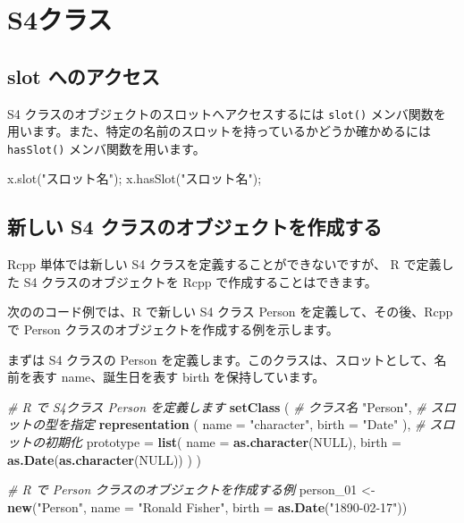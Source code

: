 \documentclass[]{book}
\newenvironment{Shaded}{\begin{snugshade}}{\end{snugshade}}
\newcommand{\CommentTok}[1]{\textcolor[rgb]{0.56,0.35,0.01}{\textit{#1}}}
\newcommand{\DataTypeTok}[1]{\textcolor[rgb]{0.13,0.29,0.53}{#1}}
\newcommand{\DecValTok}[1]{\textcolor[rgb]{0.00,0.00,0.81}{#1}}
\newcommand{\KeywordTok}[1]{\textcolor[rgb]{0.13,0.29,0.53}{\textbf{#1}}}
\newcommand{\NormalTok}[1]{#1}
\newcommand{\OtherTok}[1]{\textcolor[rgb]{0.56,0.35,0.01}{#1}}
\newcommand{\StringTok}[1]{\textcolor[rgb]{0.31,0.60,0.02}{#1}}
\begin{document}
\hypertarget{s4}{%
\section{S4クラス}\label{s4}}

\hypertarget{slot-}{%
\subsection{slot へのアクセス}\label{slot-}}

S4 クラスのオブジェクトのスロットへアクセスするには \texttt{slot()} メンバ関数を用います。また、特定の名前のスロットを持っているかどうか確かめるには \texttt{hasSlot()} メンバ関数を用います。

\begin{Shaded}
\begin{Highlighting}[]
\NormalTok{x.slot(}\StringTok{"スロット名"}\NormalTok{);}
\NormalTok{x.hasSlot(}\StringTok{"スロット名"}\NormalTok{);}
\end{Highlighting}
\end{Shaded}

\hypertarget{-s4-}{%
\subsection{新しい S4 クラスのオブジェクトを作成する}\label{-s4-}}

Rcpp 単体では新しい S4 クラスを定義することができないですが、 R で定義した S4 クラスのオブジェクトを Rcpp で作成することはできます。

次ののコード例では、R で新しい S4 クラス Person を定義して、その後、Rcpp で Person クラスのオブジェクトを作成する例を示します。

まずは S4 クラスの Person を定義します。このクラスは、スロットとして、名前を表す name、誕生日を表す birth を保持しています。

\begin{Shaded}
\begin{Highlighting}[]
\CommentTok{# R で S4クラス Person を定義します}
\KeywordTok{setClass}\NormalTok{ (}
  \CommentTok{# クラス名}
  \StringTok{"Person"}\NormalTok{,}
  \CommentTok{# スロットの型を指定}
  \KeywordTok{representation}\NormalTok{ (}
    \DataTypeTok{name =} \StringTok{"character"}\NormalTok{,}
    \DataTypeTok{birth =} \StringTok{"Date"}
\NormalTok{  ),}
  \CommentTok{# スロットの初期化}
  \DataTypeTok{prototype =} \KeywordTok{list}\NormalTok{(}
    \DataTypeTok{name =} \KeywordTok{as.character}\NormalTok{(}\OtherTok{NULL}\NormalTok{),}
    \DataTypeTok{birth =} \KeywordTok{as.Date}\NormalTok{(}\KeywordTok{as.character}\NormalTok{(}\OtherTok{NULL}\NormalTok{))}
\NormalTok{  )}
\NormalTok{)}

\CommentTok{# R で Person クラスのオブジェクトを作成する例}
\NormalTok{person_}\DecValTok{01}\NormalTok{ <-}\StringTok{ }\KeywordTok{new}\NormalTok{(}\StringTok{"Person"}\NormalTok{,}
                 \DataTypeTok{name =} \StringTok{"Ronald Fisher"}\NormalTok{,}
                 \DataTypeTok{birth =} \KeywordTok{as.Date}\NormalTok{(}\StringTok{"1890-02-17"}\NormalTok{))}
\end{Highlighting}
\end{Shaded}
\end{document}
